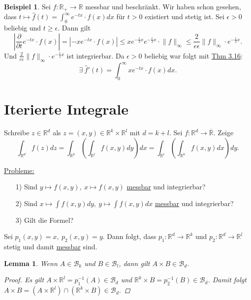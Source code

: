 \documentclass[a4paper]{scrreprt}
\newcommand{\R}{\mathbb{R}}
\newcommand{\Rq}{\overline{\R}}
\newcommand{\Borel}{\mathcal{B}}
\newcommand{\Bd}{\Borel_d}
\newcommand{\jlabel}[1]{\label{j_#1}}
\newcommand{\jhyperref}[2]{\hyperref[j_#1]{#2}}
\newcommand{\jlink}[1]{\jhyperref{#1}{#1}}
\newcommand{\jabb}[3]{ #1: #2 \rightarrow #3 }
\theoremstyle{plain}
\newtheorem{lem}[thm]{Lemma}
\theoremstyle{definition}
\newtheorem*{expl*}{Beispiel}
\begin{document}
{{{{\begin{expl*}
    Sei $\jabb{f}{\R_+}{\R}$ messbar und beschränkt. Wir haben schon gesehen, dass $t\mapsto \hat{f}(t) = \int_0^\infty e^{-tx}\cdot f(x)dx$ für $t>0$ existiert und stetig ist. Sei $\epsilon >0$ beliebig und $t\ge \epsilon$. Dann gilt
    \begin{displaymath}
        \left | \frac{\partial}{\partial t} e^{-tx} \cdot f(x) \right | = \left | -x e^{-tx}\cdot f(x) \right |\le xe^{-\frac{\epsilon}{2}x} e^{-\frac{\epsilon}{2}x} \cdot \lVert f \rVert_\infty \le \frac{2}{e\epsilon} \lVert f\rVert_\infty\cdot e^{-\frac{\epsilon}{2}x}.
    \end{displaymath}
    Und $\frac{2}{e\epsilon} \lVert f\rVert_\infty\cdot e^{-\frac{\epsilon}{2}x}$ ist integrierbar. Da $\epsilon>0$ beliebig war folgt mit \jlink{Thm 3.16}:
    \begin{displaymath}
        \exists \ \hat{f}'(t) = \int_0^\infty xe^{-tx}\cdot f(x) dx.
    \end{displaymath}
\end{expl*}
        
\section{Iterierte Integrale}
Schreibe $z\in \R^d$ als $z=(x,y) \in \R^k \times \R^l$ mit $d= k+l$. Sei $\jabb{f}{\R^d}{\Rq}$. Zeige
\begin{displaymath}
    \int_{\R^d} f(z) dz = \int_{\R^k} \left( \int_{\R^l} f(x,y) dy \right) dx = \int_{\R^l}\left( \int_{\R^k} f(x,y) dx \right) dy.
\end{displaymath}

\vspace{12pt}

\uline{Probleme:}
\begin{itemize}
    \item[1)] Sind $y\mapsto f(x,y), \ x\mapsto f(x,y)$ \jlink{messbar} und integrierbar?
    \item[2)] Sind $x \mapsto \int f(x,y)dy, \ y\mapsto \int f(x,y)dx$ \jlink{messbar} und integrierbar?
    \item[3)] Gilt die Formel?
\end{itemize}

Sei $p_1(x,y) = x, \ p_2(x,y)=y$. Dann folgt, dass $\jabb{p_1}{\R^d}{\R^k}$ und $ \jabb{p_2}{\R^d}{\R^l}$ stetig und damit \jlink{messbar} sind.

\begin{lem}
\jlabel{Lem 3.17}
    Wenn $A\in \Borel_k$ und $B \in \Borel_l$, dann gilt $A\times B \in \Bd$.
    \begin{proof}
        Es gilt $A\times \R^l = p_1^{-1}(A)\in \Bd$ und $\R^k \times B = p_2^{-1}(B) \in \Bd$. Damit folgt $A\times B = (A\times \R^l)\cap (\R^k\times B) \in \Bd$.
    \end{proof}
\end{lem}

}}}}
\end{document}
